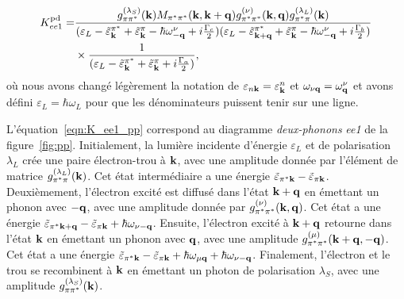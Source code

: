 \begin{equation}
    \begin{split}
    K_{ee1}^{\text{pd}} = &\frac{g^{(\lambda_S)}_{\pi\pi^*}(\mathbf{k})M_{\pi^*\pi^*}(\mathbf{k},\mathbf{k}+\mathbf{q})g^{(\nu)}_{\pi^*\pi^*}(\mathbf{k},\mathbf{q})g_{\pi^*\pi}^{(\lambda_L)}(\mathbf{k})}{(\varepsilon_L-\tilde{\varepsilon}^{\pi^*}_{\mathbf{k}}+\tilde{\varepsilon}^\pi_{\mathbf{k}}-\hbar\omega_{-\mathbf{q}}^\nu+i\frac{\Gamma_c}{2})(\varepsilon_L-\tilde{\varepsilon}_{\mathbf{k}+\mathbf{q}}^{\pi^*}+\tilde{\varepsilon}_{\mathbf{k}}^\pi-\hbar\omega_{-\mathbf{q}}^\nu+i\frac{\Gamma_b}{2})}\\
    &\times\frac{1}{(\varepsilon_L-\tilde{\varepsilon}_{\mathbf{k}}^{\pi^*}+\tilde{\varepsilon}_{\mathbf{k}}^\pi+i\frac{\Gamma_a}{2})},\label{eqn:K_ee1_pd}
    \end{split}
\end{equation}
où nous avons changé légèrement la notation de $\varepsilon_{n\mathbf{k}}=\varepsilon_{\mathbf{k}}^n$ et $\omega_{\nu\mathbf{q}} = \omega_{\mathbf{q}}^\nu$ et avons défini $\varepsilon_L=\hbar\omega_L$ pour que les dénominateurs puissent tenir sur une ligne.

L'équation~\eqref{eqn:K_ee1_pp} correspond au diagramme \textit{deux-phonons} \textit{ee1} de la figure~\ref{fig:pp}. Initialement, la lumière incidente d'énergie $\varepsilon_L$ et de polarisation $\lambda_L$ crée une paire électron-trou à $\mathbf{k}$, avec une amplitude donnée par l'élément de matrice $g_{\pi^*\pi}^{(\lambda_L)}(\mathbf{k})$. Cet état intermédiaire a une énergie $\tilde{\varepsilon}_{\pi^*\mathbf{k}}-\tilde{\varepsilon}_{\pi\mathbf{k}}$. Deuxièmement, l'électron excité est diffusé dans l'état $\mathbf{k}+\mathbf{q}$ en émettant un phonon avec $-\mathbf{q}$, avec une amplitude donnée par $g_{\pi^*\pi^*}^{(\nu)}(\mathbf{k},\mathbf{q})$. Cet état a une énergie $\tilde{\varepsilon}_{\pi^*\mathbf{k}+\mathbf{q}}-\tilde{\varepsilon}_{\pi\mathbf{k}}+\hbar\omega_{\nu-\mathbf{q}}$. Ensuite, l'électron excité à $\mathbf{k}+\mathbf{q}$ retourne dans l'état $\mathbf{k}$ en émettant un phonon avec $\mathbf{q}$, avec une amplitude $g_{\pi^*\pi^*}^{(\mu)}(\mathbf{k}+\mathbf{q},-\mathbf{q})$. Cet état a une énergie $\tilde{\varepsilon}_{\pi^*\mathbf{k}}-\tilde{\varepsilon}_{\pi\mathbf{k}}+\hbar\omega_{\mu\mathbf{q}}+\hbar\omega_{\nu-\mathbf{q}}$. Finalement, l'électron et le trou se recombinent à $\mathbf{k}$ en émettant un photon de polarisation $\lambda_S$, avec une amplitude $g^{(\lambda_S)}_{\pi\pi^*}(\mathbf{k})$.

